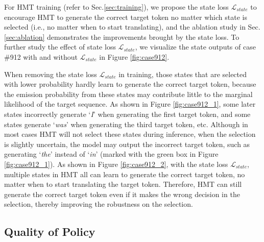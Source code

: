 \documentclass{article} %
\begin{document}
For HMT training (refer to Sec.\ref{sec:training}), we propose the state loss $\mathcal{L}_{state}$ to encourage HMT to generate the correct target token no matter which state is selected (i.e., no matter when to start translating), and the ablation study in Sec.\ref{sec:ablation} demonstrates the improvements brought by the state loss. To further study the effect of state loss $\mathcal{L}_{state}$, we visualize the state outputs of case \#912 with and without $\mathcal{L}_{state}$ in Figure \ref{fig:case912}.

When removing the state loss $\mathcal{L}_{state}$ in training, those states that are selected with lower probability hardly learn to generate the correct target token, because the emission probability from these states may contribute little to the marginal likelihood of the target sequence. As shown in Figure \ref{fig:case912_1}, some later states incorrectly generate `\textit{I}' when generating the first target token, and some states generate `\textit{was}' when generating the third target token, etc. Although in most cases HMT will not select these states during inference, when the selection is slightly uncertain, the model may output the incorrect target token, such as generating `\textit{the}' instead of `\textit{in}' (marked with the green box in Figure \ref{fig:case912_1}). As shown in Figure \ref{fig:case912_2}, with the state loss $\mathcal{L}_{state}$, multiple states in HMT all can learn to generate the correct target token, no matter when to start translating the target token. Therefore, HMT can still generate the correct target token even if it makes the wrong decision in the selection, thereby improving the robustness on the selection.


\subsection{Quality of Policy}
\end{document}
